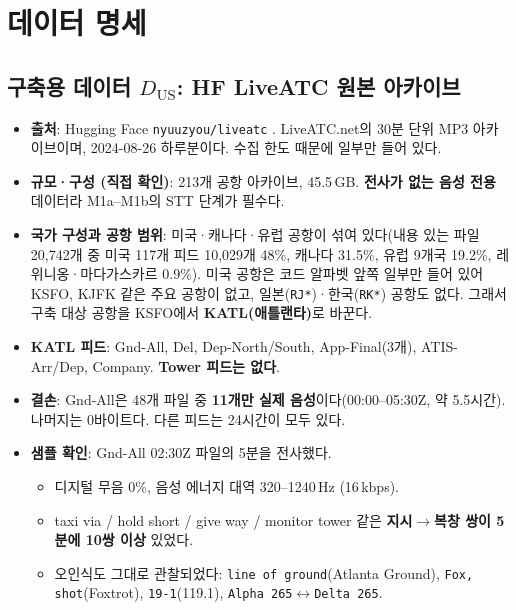 \documentclass[10pt,a4paper]{article}
\newcommand{\cmd}[1]{\textsf{\small #1}}
\begin{document}
\section{데이터 명세}\label{sec:data}
\subsection{구축용 데이터 $D_{\mathrm{US}}$: HF LiveATC 원본 아카이브}
\begin{itemize}
\item \textbf{출처}: Hugging Face \texttt{nyuuzyou/liveatc} \cite{hfliveatc}. LiveATC.net의 30분 단위 MP3 아카이브이며, 2024-08-26 하루분이다. 수집 한도 때문에 일부만 들어 있다.
\item \textbf{규모·구성 (직접 확인)}: 213개 공항 아카이브, 45.5\,GB. \textbf{전사가 없는 음성 전용} 데이터라 M1a--M1b의 STT 단계가 필수다.
\item \textbf{국가 구성과 공항 범위}: 미국·캐나다·유럽 공항이 섞여 있다(내용 있는 파일 20,742개 중 미국 117개 피드 10,029개 48\%, 캐나다 31.5\%, 유럽 9개국 19.2\%, 레위니옹·마다가스카르 0.9\%). 미국 공항은 코드 알파벳 앞쪽 일부만 들어 있어 KSFO, KJFK 같은 주요 공항이 없고, 일본(\texttt{RJ*})·한국(\texttt{RK*}) 공항도 없다. 그래서 구축 대상 공항을 KSFO에서 \textbf{KATL(애틀랜타)}로 바꾼다.
\item \textbf{KATL 피드}: \cmd{Gnd-All}, \cmd{Del}, \cmd{Dep-North/South}, \cmd{App-Final}(3개), \cmd{ATIS-Arr/Dep}, \cmd{Company}. \textbf{Tower 피드는 없다}.
\item \textbf{결손}: \cmd{Gnd-All}은 48개 파일 중 \textbf{11개만 실제 음성}이다(00:00--05:30Z, 약 5.5시간). 나머지는 0바이트다. 다른 피드는 24시간이 모두 있다.
\item \textbf{샘플 확인}: \cmd{Gnd-All} 02:30Z 파일의 5분을 전사했다.
  \begin{itemize}
  \item 디지털 무음 0\%, 음성 에너지 대역 320--1240\,Hz (16\,kbps).
  \item taxi via / hold short / give way / monitor tower 같은 \textbf{지시$\to$복창 쌍이 5분에 10쌍 이상} 있었다.
  \item 오인식도 그대로 관찰되었다: \texttt{line of ground}(Atlanta Ground), \texttt{Fox, shot}(Foxtrot), \texttt{19-1}(119.1), \texttt{Alpha 265}$\leftrightarrow$\texttt{Delta 265}.
  \end{itemize}
\end{itemize}
\end{document}
